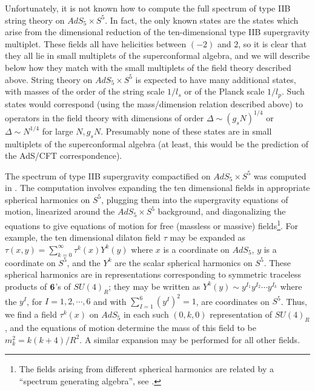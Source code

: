 Unfortunately, it is not known how to compute the full spectrum of
type IIB string theory on $AdS_5\times S^5$. In fact, the only known
states are the states which arise from the dimensional reduction of
the ten-dimensional type IIB supergravity multiplet. These fields all
have helicities between $(-2)$ and $2$, so it is clear that they all
lie in small multiplets of the superconformal algebra, and we will
describe below how they match with the small multiplets of the field
theory described above. String theory on $AdS_5\times S^5$ is expected
to have many additional states, with masses of the order of the string
scale $1/l_s$ or of the Planck scale $1/l_p$. Such states would
correspond (using the mass/dimension relation described above) to
operators in the field theory with dimensions of order $\Delta \sim
(g_s N)^{1/4}$ or $\Delta \sim N^{1/4}$ for large $N, g_s N$. 
Presumably none of these
states are in small multiplets of the superconformal algebra (at
least, this would be the prediction of the AdS/CFT correspondence).

The spectrum of type IIB supergravity compactified on $AdS_5\times
S^5$ was computed in \cite{Kim:1985ez}. 
The computation involves expanding the ten
dimensional fields in appropriate spherical harmonics on $S^5$,
plugging them into the supergravity equations of motion, linearized
around the $AdS_5\times S^5$ background, and diagonalizing the
equations to give equations of motion for free (massless or massive)
fields\footnote{The fields arising from different spherical harmonics
are related by a ``spectrum generating algebra'', 
see \cite{Berglund:1999}.}. 
For example, the ten dimensional dilaton field $\tau$ may be
expanded as $\tau(x,y) = \sum_{k=0}^{\infty} \tau^k(x) Y^k(y)$ where
$x$ is a coordinate on $AdS_5$, $y$ is a coordinate on $S^5$, and the
$Y^k$ are the scalar spherical harmonics on $S^5$. These spherical
harmonics are in representations corresponding to symmetric traceless
products of $\bf 6$'s of $SU(4)_R$; they may be written as $Y^k(y)
\sim y^{I_1} y^{I_2} \cdots y^{I_k}$ where the $y^I$, for
$I=1,2,\cdots,6$ and with $\sum_{I=1}^6 (y^I)^2 = 1$, are coordinates
on $S^5$. Thus, we find a field $\tau^k(x)$ on $AdS_5$ in each such
$(0,k,0)$ representation of $SU(4)_R$, and the equations of motion
determine the mass of this field to be $m_k^2 = k(k+4)/R^2$. A similar
expansion may be performed for all other fields.

